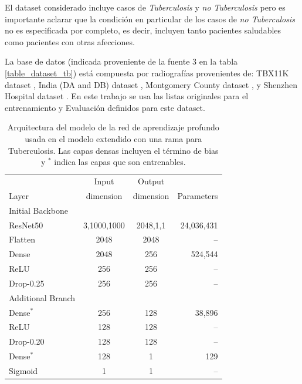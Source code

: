 {El dataset considerado incluye casos de
\textit{Tuberculosis} y \textit{no Tuberculosis} pero es
importante aclarar que la condición en particular de los casos de \textit{no Tuberculosis} no es
especificada por completo, es decir, incluyen tanto pacientes saludables como pacientes con otras
afecciones.


La base de datos (indicada proveniente de la fuente 3 en la tabla \ref{table_dataset_tb}) está
compuesta por radiografías provenientes de: TBX11K dataset \cite{liu2020rethinking},
India (DA and DB) dataset \cite{chauhan2014role}, Montgomery County dataset \cite{jaeger2014two}, y
Shenzhen Hospital dataset \cite{jaeger2014two}. En este trabajo se usa las listas originales para el
entrenamiento y Evaluación definidos para este dataset.

\begin{table}[!ht]
    \centering
    \begin{tabular}{| l| c | c | r |}
     \hline
                 &  Input       & Output           &   \\
    Layer        &  dimension    & dimension        & Parameters \\
    \hline\hline
    Initial Backbone & & & \\ \hline
    ResNet50     &  3,1000,1000 &     2048,1,1     & 24,036,431 \\
    Flatten      &     2048     &     2048         &  --        \\
    Dense        &     2048     &     256          & 524,544    \\
    ReLU         &     256      &     256          & --         \\
    Drop-0.25    &     256      &     256          & --         \\
    \hline
    Additional Branch & & & \\ \hline
    Dense$^\ast$ &     256      &     128          &  38,896     \\
    ReLU         &     128      &     128          & --         \\
    Drop-0.20    &     128      &     128          & --         \\
    Dense$^\ast$ &     128      &      1           &  129       \\
    Sigmoid      &      1       &      1           & --         \\
     \hline
    \end{tabular}
    \caption{ Arquitectura del modelo de la red de aprendizaje profundo usada en el modelo extendido
             con una rama para Tuberculosis. Las capas densas incluyen el término de bias y $^\ast$
             indica las capas que son entrenables.}
\label{table_resnet50_tb}
\end{table}

}
